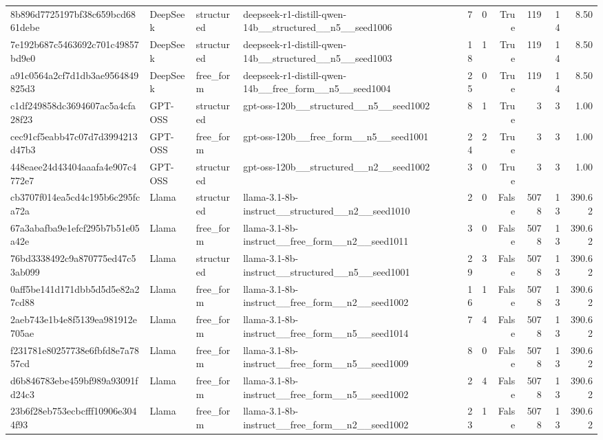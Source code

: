 \begin{longtable}{llllrrrrrr}
8b896d7725197bf38c659bcd6861debe & DeepSeek & structured & deepseek-r1-distill-qwen-14b\_\_structured\_\_n5\_\_seed1006 & 7 & 0 & True & 119 & 14 & 8.50 \\
7e192b687c5463692c701c49857bd9e0 & DeepSeek & structured & deepseek-r1-distill-qwen-14b\_\_structured\_\_n5\_\_seed1003 & 18 & 1 & True & 119 & 14 & 8.50 \\
a91c0564a2cf7d1db3ae9564849825d3 & DeepSeek & free\_form & deepseek-r1-distill-qwen-14b\_\_free\_form\_\_n5\_\_seed1004 & 25 & 0 & True & 119 & 14 & 8.50 \\
c1df249858dc3694607ac5a4cfa28f23 & GPT-OSS & structured & gpt-oss-120b\_\_structured\_\_n5\_\_seed1002 & 8 & 1 & True & 3 & 3 & 1.00 \\
cec91cf5eabb47c07d7d3994213d47b3 & GPT-OSS & free\_form & gpt-oss-120b\_\_free\_form\_\_n5\_\_seed1001 & 24 & 2 & True & 3 & 3 & 1.00 \\
448eaee24d43404aaafa4e907c4772e7 & GPT-OSS & structured & gpt-oss-120b\_\_structured\_\_n2\_\_seed1002 & 3 & 0 & True & 3 & 3 & 1.00 \\
cb3707f014ea5cd4c195b6c295fca72a & Llama & structured & llama-3.1-8b-instruct\_\_structured\_\_n2\_\_seed1010 & 2 & 0 & False & 5078 & 13 & 390.62 \\
67a3abafba9e1efcf295b7b51e05a42e & Llama & free\_form & llama-3.1-8b-instruct\_\_free\_form\_\_n2\_\_seed1011 & 3 & 0 & False & 5078 & 13 & 390.62 \\
76bd3338492c9a870775ed47c53ab099 & Llama & structured & llama-3.1-8b-instruct\_\_structured\_\_n5\_\_seed1001 & 29 & 3 & False & 5078 & 13 & 390.62 \\
0aff5be141d171dbb5d5d5e82a27cd88 & Llama & free\_form & llama-3.1-8b-instruct\_\_free\_form\_\_n2\_\_seed1002 & 16 & 1 & False & 5078 & 13 & 390.62 \\
2aeb743e1b4e8f5139ea981912e705ae & Llama & free\_form & llama-3.1-8b-instruct\_\_free\_form\_\_n5\_\_seed1014 & 7 & 4 & False & 5078 & 13 & 390.62 \\
f231781e80257738e6fbfd8e7a7857cd & Llama & free\_form & llama-3.1-8b-instruct\_\_free\_form\_\_n5\_\_seed1009 & 8 & 0 & False & 5078 & 13 & 390.62 \\
d6b846783ebe459bf989a93091fd24c3 & Llama & free\_form & llama-3.1-8b-instruct\_\_free\_form\_\_n5\_\_seed1002 & 2 & 4 & False & 5078 & 13 & 390.62 \\
23b6f28eb753ecbcfff10906e3044f93 & Llama & free\_form & llama-3.1-8b-instruct\_\_free\_form\_\_n2\_\_seed1002 & 23 & 1 & False & 5078 & 13 & 390.62 \\

\end{longtable}
